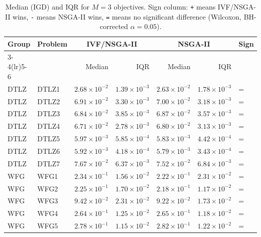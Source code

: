 \begin{table}[t]
\centering
\caption{Median (IGD) and IQR for $M=3$ objectives. Sign column: \texttt{+} means IVF/NSGA-II wins, \texttt{-} means NSGA-II wins, \texttt{=} means no significant difference (Wilcoxon, BH-corrected $\alpha=0.05$).}
\label{tab:igd_m3_ivfnsga-ii}
\scriptsize
\begin{tabular}{llrrrrl}
\toprule
Group & Problem & \multicolumn{2}{c}{IVF/NSGA-II} & \multicolumn{2}{c}{NSGA-II} & Sign \\
\cmidrule(lr){3-4}\cmidrule(lr){5-6}
 & & Median & IQR & Median & IQR & \\
\midrule
DTLZ & DTLZ1 & $2.68\!\times\!10^{-2}$ & $1.39\!\times\!10^{-3}$ & $2.63\!\times\!10^{-2}$ & $1.78\!\times\!10^{-3}$ & = \\
DTLZ & DTLZ2 & $6.91\!\times\!10^{-2}$ & $3.30\!\times\!10^{-3}$ & $7.00\!\times\!10^{-2}$ & $3.18\!\times\!10^{-3}$ & = \\
DTLZ & DTLZ3 & $6.84\!\times\!10^{-2}$ & $3.85\!\times\!10^{-3}$ & $6.87\!\times\!10^{-2}$ & $3.57\!\times\!10^{-3}$ & = \\
DTLZ & DTLZ4 & $6.71\!\times\!10^{-2}$ & $2.78\!\times\!10^{-3}$ & $6.80\!\times\!10^{-2}$ & $3.13\!\times\!10^{-3}$ & = \\
DTLZ & DTLZ5 & $5.97\!\times\!10^{-3}$ & $5.85\!\times\!10^{-4}$ & $5.83\!\times\!10^{-3}$ & $4.42\!\times\!10^{-4}$ & = \\
DTLZ & DTLZ6 & $5.92\!\times\!10^{-3}$ & $4.18\!\times\!10^{-4}$ & $5.79\!\times\!10^{-3}$ & $3.43\!\times\!10^{-4}$ & = \\
DTLZ & DTLZ7 & $7.67\!\times\!10^{-2}$ & $6.37\!\times\!10^{-3}$ & $7.52\!\times\!10^{-2}$ & $6.84\!\times\!10^{-3}$ & = \\
\addlinespace
WFG & WFG1 & $2.34\!\times\!10^{-1}$ & $1.56\!\times\!10^{-2}$ & $2.22\!\times\!10^{-1}$ & $2.31\!\times\!10^{-2}$ & = \\
WFG & WFG2 & $2.25\!\times\!10^{-1}$ & $1.70\!\times\!10^{-2}$ & $2.18\!\times\!10^{-1}$ & $1.17\!\times\!10^{-2}$ & = \\
WFG & WFG3 & $9.42\!\times\!10^{-2}$ & $2.31\!\times\!10^{-2}$ & $9.22\!\times\!10^{-2}$ & $1.73\!\times\!10^{-2}$ & = \\
WFG & WFG4 & $2.64\!\times\!10^{-1}$ & $1.25\!\times\!10^{-2}$ & $2.65\!\times\!10^{-1}$ & $1.18\!\times\!10^{-2}$ & = \\
WFG & WFG5 & $2.78\!\times\!10^{-1}$ & $1.15\!\times\!10^{-2}$ & $2.82\!\times\!10^{-1}$ & $1.22\!\times\!10^{-2}$ & = \\

\end{tabular}
\end{table}

